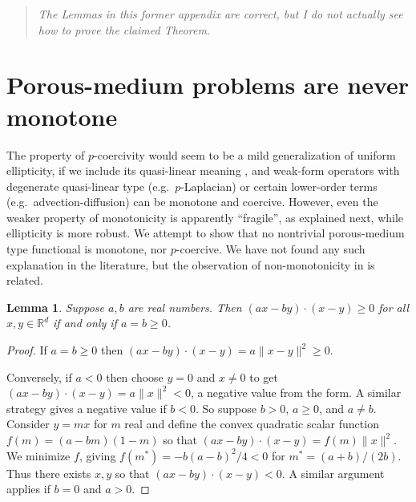 \documentclass[letterpaper,final,12pt,reqno]{amsart}
\theoremstyle{cstyle}
\newtheorem{lemma}[theorem]{Lemma}
\theoremstyle{cstyle*}
\theoremstyle{dstyle}
\numberwithin{equation}{section}
\numberwithin{figure}{section}
\numberwithin{table}{section}
\numberwithin{theorem}{section}
\newcommand{\RR}{\mathbb{R}}
\begin{document}
\appendix

\begin{quote}
\emph{The Lemmas in this former appendix are correct, but I do not actually see how to prove the claimed Theorem.}
\end{quote}

\section{Porous-medium problems are never monotone}

The property of $p$-coercivity would seem to be a mild generalization of uniform ellipticity, if we include its quasi-linear meaning \cite[Section 8.3]{Evans2010}, and weak-form operators with degenerate quasi-linear type (e.g.~$p$-Laplacian) or certain lower-order terms (e.g.~advection-diffusion) can be monotone and coercive.  However, even the weaker property of monotonicity is apparently ``fragile'', as explained next, while ellipticity is more robust.  We attempt to show that no nontrivial porous-medium type functional is monotone, nor $p$-coercive.  We have not found any such explanation in the literature, but the observation of non-monotonicity in \cite{RocknerWang2008} is related.

\begin{lemma}  Suppose $a,b$ are real numbers.  Then $(ax-by)\cdot(x-y) \ge 0$ for all $x,y\in\RR^d$ if and only if $a=b\ge 0$.
\end{lemma}

\begin{proof}
If $a=b\ge 0$ then $(ax-by)\cdot(x-y) = a\|x-y\|^2 \ge 0$.

Conversely, if $a< 0$ then choose $y=0$ and $x\ne 0$ to get $(ax-by)\cdot(x-y) = a\|x\|^2<0$, a negative value from the form.  A similar strategy gives a negative value if $b<0$.  So suppose $b > 0$, $a\ge 0$, and $a\ne b$.  Consider $y=mx$ for $m$ real and define the convex quadratic scalar function $f(m) = (a-bm)(1-m)$ so that $(ax-by)\cdot(x-y) = f(m) \|x\|^2$.  We minimize $f$, giving $f(m^*) = -b(a-b)^2/4 < 0$ for $m^*=(a+b)/(2b)$.  Thus there exists $x,y$ so that $(ax-by)\cdot(x-y)<0$.  A similar argument applies if $b=0$ and $a>0$.
\end{proof}
\end{document}
